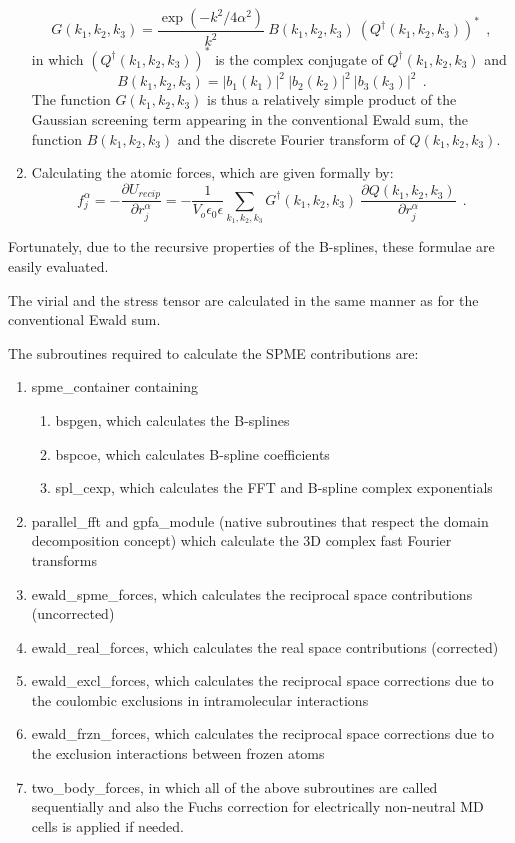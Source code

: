 \begin{enumerate}
\begin{equation}
G(k_{1},k_{2},k_{3}) = \frac{\exp(-k^{2}/4\alpha^{2})}{k^{2}}~
B(k_{1},k_{2},k_{3})~(Q^{\dagger}(k_{1},k_{2},k_{3}))^{*}~~,
\end{equation}
in which $(Q^{\dagger}(k_{1},k_{2},k_{3}))^{*}$ is the complex
conjugate of $Q^{\dagger}(k_{1},k_{2},k_{3})$ and
\begin{equation}
B(k_{1},k_{2},k_{3}) = |b_{1}(k_{1})|^{2}~|b_{2}(k_{2})|^{2}~|b_{3}(k_{3})|^{2}~~.
\end{equation}
The function $G(k_{1},k_{2},k_{3})$ is thus a relatively simple
product of the Gaussian screening term appearing in the
conventional Ewald sum, the function $B(k_{1},k_{2},k_{3})$ and
the discrete Fourier transform of $Q(k_{1},k_{2},k_{3})$.
\item Calculating the atomic forces, which are given formally by:
\begin{equation}
f_{j}^{\alpha} = -\frac{\partial U_{recip}}{\partial
r_{j}^{\alpha}} = -\frac{1}{V_{o} \epsilon_{0}\epsilon}
\sum_{k_{1},k_{2},k_{3}} G^{\dagger}(k_{1},k_{2},k_{3})
~\frac{\partial Q(k_{1},k_{2},k_{3})}{\partial r_{j}^{\alpha}}~~.
\end{equation}
\end{enumerate}
Fortunately, due to the recursive properties of the B-splines, these
formulae are easily evaluated.

The virial and the stress tensor are calculated in the same manner as
for the conventional Ewald sum.

The \D subroutines required to calculate the SPME contributions
are:
\begin{enumerate}
\item {\sc spme\_container} containing
\begin{enumerate}
\item {\sc bspgen}, which calculates the B-splines
\item {\sc bspcoe}, which calculates B-spline coefficients
\item {\sc spl\_cexp}, which calculates the FFT and B-spline complex exponentials
\end{enumerate}
\item {\sc parallel\_fft} and {\sc gpfa\_module} (native \D subroutines
that respect the domain decomposition concept) which calculate the
3D complex fast Fourier transforms
\item {\sc ewald\_spme\_forces}, which calculates the reciprocal space contributions (uncorrected)
\item {\sc ewald\_real\_forces}, which calculates the real space contributions (corrected)
\item {\sc ewald\_excl\_forces}, which calculates the reciprocal space corrections
due to the coulombic exclusions in intramolecular interactions
\item {\sc ewald\_frzn\_forces}, which calculates the reciprocal space corrections
due to the exclusion interactions between frozen atoms
\item {\sc two\_body\_forces}, in which all of the above
subroutines are called sequentially and also the Fuchs correction
\cite{fuchs-35a} for electrically non-neutral MD cells is applied if
needed.
\end{enumerate}

